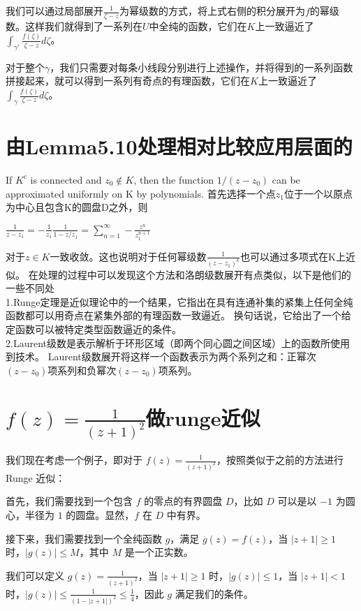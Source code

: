 \documentclass[12pt, a4paper, oneside]{article}
\begin{document}
\begin{spacing}{2.0}
我们可以通过局部展开$\frac{1}{\zeta-z}$为幂级数的方式，将上式右侧的积分展开为$f$的幂级数。这样我们就得到了一系列在$U$中全纯的函数，它们在$K$上一致逼近了$\displaystyle\int_{\gamma'}\frac{f(\zeta)}{\zeta-z}d\zeta$。

对于整个$\gamma$，我们只需要对每条小线段分别进行上述操作，并将得到的一系列函数拼接起来，就可以得到一系列有奇点的有理函数，它们在$K$上一致逼近了$\displaystyle\int_{\gamma}\frac{f(\zeta)}{\zeta-z}d\zeta$。


\section{由Lemma5.10处理相对比较应用层面的}
If $K^c$ is connected and $z_0 \notin K$, then the function $1/(z − z_0)$ can be approximated uniformly on K by polynomials.
首先选择一个点$z_1$位于一个以原点为中心且包含K的圆盘D之外，则
\begin{center}
    $\displaystyle\frac{1}{z-z_1} = -\frac{1}{z_1}\frac{1}{1-z/z_1} = \sum_{n = 1}^{\infty}-\frac{z^n}{z_1^{n+1}}$
\end{center}
对于$z\in K$一致收敛。这也说明对于任何幂级数$\frac{1}{(z-z_1)^k}$也可以通过多项式在K上近似。
在处理的过程中可以发现这个方法和洛朗级数展开有点类似，以下是他们的一些不同处\\
1.Runge定理是近似理论中的一个结果，它指出在具有连通补集的紧集上任何全纯函数都可以用奇点在紧集外部的有理函数一致逼近。
换句话说，它给出了一个给定函数可以被特定类型函数逼近的条件。\\

2.Laurent级数是表示解析于环形区域（即两个同心圆之间区域）上的函数所使用到技术。
Laurent级数展开将这样一个函数表示为两个系列之和：正幂次$(z-z_0)$项系列和负幂次$(z-z_0)$项系列。

\section{$f(z) = \frac{1}{(z+1)^2}$做runge近似}
我们现在考虑一个例子，即对于 $f(z) = \frac{1}{(z+1)^2}$，按照类似于之前的方法进行 Runge 近似：

首先，我们需要找到一个包含 $f$ 的零点的有界圆盘 $D$，比如 $D$ 可以是以 $-1$ 为圆心，半径为 $1$ 的圆盘。显然，$f$ 在 $D$ 中有界。

接下来，我们需要找到一个全纯函数 $g$，满足 $g(z) = f(z)$，当 $|z+1| \geq 1$ 时，$|g(z)| \leq M$，其中 $M$ 是一个正实数。

我们可以定义 $g(z) = \frac{1}{(z+1)^2}$，当 $|z+1| \geq 1$ 时，$|g(z)| \leq 1$，当 $|z+1| < 1$ 时，$|g(z)| \leq \frac{1}{(1-|z+1|)^2} \leq \frac{1}{4}$，因此 $g$ 满足我们的条件。


\end{spacing}
\end{document}
